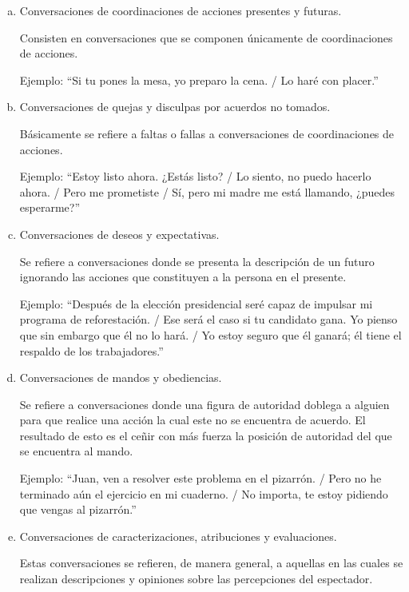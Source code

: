 \documentclass[10pt]{article}
\begin{document}
        \begin{enumerate}[a.]
        \item Conversaciones de coordinaciones de acciones presentes y futuras.
        
        Consisten en conversaciones que se componen únicamente de coordinaciones de acciones.

        Ejemplo: ``Si tu pones la mesa, yo preparo la cena. / Lo haré con placer.''

        
        \item Conversaciones de quejas y disculpas por acuerdos no tomados.
            
        Básicamente se refiere a faltas o fallas a conversaciones de coordinaciones de acciones.
                
        Ejemplo: ``Estoy listo ahora. ¿Estás listo? / Lo siento, no puedo hacerlo ahora. / Pero me prometiste / Sí, pero mi madre me está llamando, ¿puedes esperarme?''
        
        \item Conversaciones de deseos y expectativas.
            
        Se refiere a conversaciones donde se presenta la descripción de un futuro ignorando las acciones que constituyen a la persona en el presente.

        Ejemplo: ``Después de la elección presidencial seré capaz de impulsar mi programa de reforestación. / Ese será el caso si tu candidato gana. Yo pienso que sin embargo que él no lo hará. / Yo estoy seguro que él ganará; él tiene el respaldo de los trabajadores.''
        
        \item Conversaciones de mandos y obediencias.

        Se refiere a conversaciones donde una figura de autoridad doblega a alguien para que realice una acción la cual este no se encuentra de acuerdo. El resultado de esto es el ceñir con más fuerza la posición de autoridad del que se encuentra al mando.
                
        Ejemplo: ``Juan, ven a resolver este problema en el pizarrón. / Pero no he terminado aún el ejercicio en mi cuaderno. / No importa, te estoy pidiendo que vengas al pizarrón.''
        
        \item Conversaciones de caracterizaciones, atribuciones y evaluaciones.
            
        Estas conversaciones se refieren, de manera general, a aquellas en las cuales se realizan descripciones y opiniones sobre las percepciones del espectador. 
                

\end{enumerate}
\end{document}
